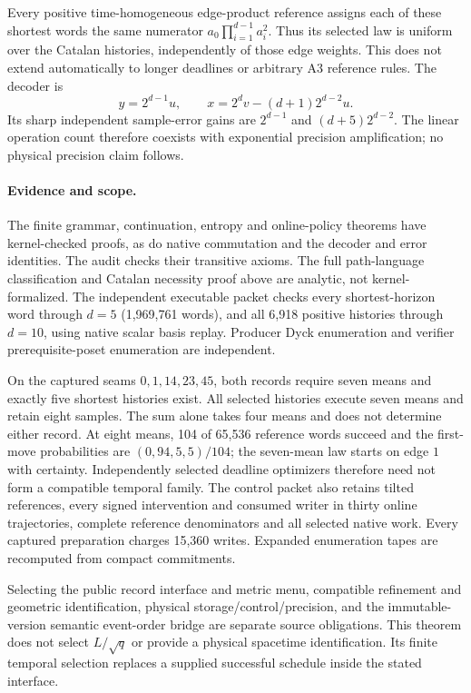 Every positive time-homogeneous edge-product reference assigns each of
these shortest words the same numerator
$a_0\prod_{i=1}^{d-1}a_i^2$. Thus its selected law is uniform over the
Catalan histories, independently of those edge weights. This does not
extend automatically to longer deadlines or arbitrary A3 reference rules.
The decoder is
\[
 y=2^{d-1}u,\qquad x=2^dv-(d+1)2^{d-2}u.
\]
Its sharp independent sample-error gains are $2^{d-1}$ and
$(d+5)2^{d-2}$. The linear operation count therefore coexists with
exponential precision amplification; no physical precision claim follows.

\paragraph{Evidence and scope.}
The finite grammar, continuation, entropy and online-policy theorems have
kernel-checked proofs, as do native commutation and the decoder and error
identities. The audit checks their transitive axioms. The full path-language
classification and Catalan necessity proof above are analytic, not
kernel-formalized. The independent executable packet checks every
shortest-horizon word through $d=5$ (1,969,761 words), and all 6,918 positive
histories through $d=10$, using native scalar basis replay. Producer Dyck
enumeration and verifier prerequisite-poset enumeration are independent.

On the captured seams $0,1,14,23,45$, both records require seven means and
exactly five shortest histories exist. All selected histories execute
seven means and retain eight samples. The sum alone takes four means and
does not determine either record. At eight means, 104 of 65,536 reference
words succeed and the first-move probabilities are $(0,94,5,5)/104$; the
seven-mean law starts on edge $1$ with certainty. Independently selected
deadline optimizers therefore need not form a compatible temporal family.
The control packet also retains tilted references, every signed
intervention and consumed writer in thirty online trajectories, complete
reference denominators and all selected native work. Every captured
preparation charges 15,360 writes. Expanded enumeration tapes are
recomputed from compact commitments.

Selecting the public record interface and metric menu, compatible
refinement and geometric identification, physical storage/control/precision,
and the immutable-version semantic event-order bridge are separate
source obligations. This theorem does not select $L/\sqrt q$ or provide a
physical spacetime identification. Its finite temporal selection replaces a
supplied successful schedule inside the stated interface.
